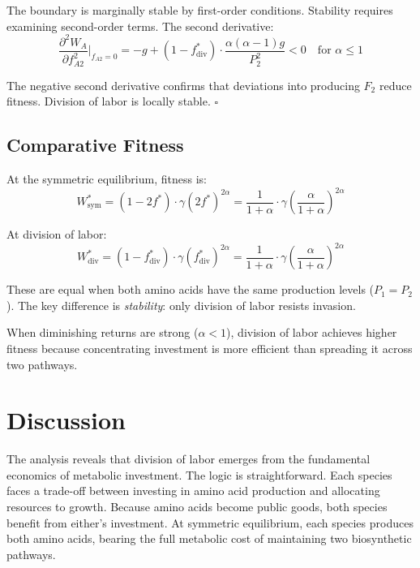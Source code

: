 \documentclass[11pt]{article}
\begin{document}
The boundary is marginally stable by first-order conditions. Stability requires examining second-order terms. The second derivative:
\begin{equation}
\frac{\partial^2 W_A}{\partial f_{A2}^2}\bigg|_{f_{A2}=0} = -g + (1-f^*_{\text{div}}) \cdot \frac{\alpha(\alpha-1)g}{P_2^2} < 0 \quad \text{for } \alpha \leq 1
\end{equation}

The negative second derivative confirms that deviations into producing $F_2$ reduce fitness. Division of labor is locally stable. \hfill $\square$

\subsection{Comparative Fitness}

At the symmetric equilibrium, fitness is:
\begin{equation}
W^*_{\text{sym}} = (1 - 2f^*) \cdot \gamma (2f^*)^{2\alpha} = \frac{1}{1+\alpha} \cdot \gamma \left(\frac{\alpha}{1+\alpha}\right)^{2\alpha}
\end{equation}

At division of labor:
\begin{equation}
W^*_{\text{div}} = (1 - f^*_{\text{div}}) \cdot \gamma (f^*_{\text{div}})^{2\alpha} = \frac{1}{1+\alpha} \cdot \gamma \left(\frac{\alpha}{1+\alpha}\right)^{2\alpha}
\end{equation}

These are equal when both amino acids have the same production levels ($P_1 = P_2$). The key difference is \textit{stability}: only division of labor resists invasion.

When diminishing returns are strong ($\alpha < 1$), division of labor achieves higher fitness because concentrating investment is more efficient than spreading it across two pathways.

\section{Discussion}

The analysis reveals that division of labor emerges from the fundamental economics of metabolic investment. The logic is straightforward. Each species faces a trade-off between investing in amino acid production and allocating resources to growth. Because amino acids become public goods, both species benefit from either's investment. At symmetric equilibrium, each species produces both amino acids, bearing the full metabolic cost of maintaining two biosynthetic pathways.
\end{document}
